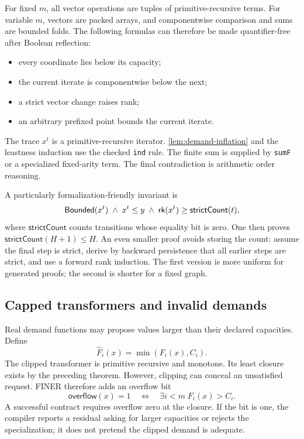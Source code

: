 For fixed \(m\), all vector operations are tuples of primitive-recursive terms.  For variable \(m\), vectors are packed arrays, and componentwise comparison and sums are bounded folds.  The following formulas can therefore be made quantifier-free after Boolean reflection:
\begin{itemize}[leftmargin=2em]
\item every coordinate lies below its capacity;
\item the current iterate is componentwise below the next;
\item a strict vector change raises rank;
\item an arbitrary prefixed point bounds the current iterate.
\end{itemize}
The trace \(x^t\) is a primitive-recursive iterator.  \cref{lem:demand-inflation} and the leastness induction use the checked \texttt{ind} rule.  The finite sum is supplied by \texttt{sumF} or a specialized fixed-arity term.  The final contradiction is arithmetic order reasoning.

A particularly formalization-friendly invariant is
\begin{equation}
  \mathsf{Bounded}(x^t)\;\wedge\;
  x^t\leq y\;\wedge\;
  \mathsf{rk}(x^t)\geq \mathsf{strictCount}(t),
  \label{eq:demand-invariant}
\end{equation}
where \(\mathsf{strictCount}\) counts transitions whose equality bit is zero.  One then proves \(\mathsf{strictCount}(H+1)\leq H\).  An even smaller proof avoids storing the count: assume the final step is strict, derive by backward persistence that all earlier steps are strict, and use a forward rank induction.  The first version is more uniform for generated proofs; the second is shorter for a fixed graph.

\subsection{Capped transformers and invalid demands}

Real demand functions may propose values larger than their declared capacities.  Define
\[
  \widehat F_i(x)=\min(F_i(x),C_i).
\]
The clipped transformer is primitive recursive and monotone.  Its least closure exists by the preceding theorem.  However, clipping can conceal an unsatisfied request.  FINER therefore adds an overflow bit
\[
  \mathsf{overflow}(x)=1
  \quad\Longleftrightarrow\quad
  \exists i<m\;F_i(x)>C_i.
\]
A successful contract requires overflow zero at the closure.  If the bit is one, the compiler reports a residual asking for larger capacities or rejects the specialization; it does not pretend the clipped demand is adequate.

